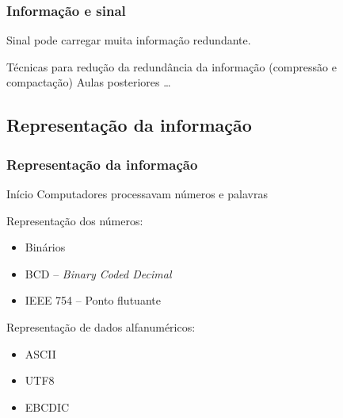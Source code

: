\documentclass[xcolor]{beamer}
\begin{document}
\begin{frame}
    \frametitle{Informação e sinal}

    Sinal pode carregar muita informação redundante.

    \vspace{0.25cm}

    Técnicas para redução da redundância da informação (compressão e
    compactação) \implica Aulas posteriores \ldots
\end{frame}

\subsection{Representação da informação}

\begin{frame}
    \frametitle{Representação da informação}

    Início \implica Computadores processavam números e palavras

    \vspace{0.25cm}

    Representação dos números:

    \begin{itemize}
        \item Binários
        \item BCD -- {\it Binary Coded Decimal}
        \item IEEE 754 -- Ponto flutuante
    \end{itemize}

    Representação de dados alfanuméricos:

    \begin{itemize}
        \item ASCII
        \item UTF8
        \item EBCDIC
    \end{itemize}
\end{frame}
\end{document}
